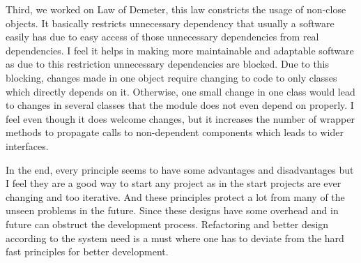 Third, we worked on Law of Demeter, this law constricts the usage of non-close objects. It basically restricts unnecessary dependency that usually a software easily has due to easy access of those unnecessary dependencies from real dependencies. I feel it helps in making more maintainable and adaptable software as due to this restriction unnecessary dependencies are blocked. Due to this blocking, changes made in one object require changing to code to only classes which directly depends on it. Otherwise, one small change in one class would lead to changes in several classes that the module does not even depend on properly. I feel even though it does welcome changes, but it increases the number of wrapper methods to propagate calls to non-dependent components which leads to wider interfaces.

In the end, every principle seems to have some advantages and disadvantages but I feel they are a good way to start any project as in the start projects are ever changing and too iterative. And these principles protect a lot from many of the unseen problems in the future. Since these designs have some overhead and in future can obstruct the development process. Refactoring and better design according to the system need is a must where one has to deviate from the hard fast principles for better development.
